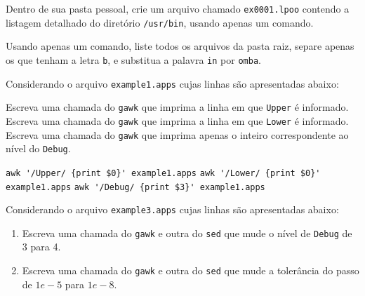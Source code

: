 \begin{Exercise}[label={0001},difficulty={1},origin={bash}]
  Dentro de sua pasta pessoal, crie um arquivo chamado \verb+ex0001.lpoo+
  contendo a listagem detalhado do diretório \verb+/usr/bin+, usando apenas um
  comando. 
\end{Exercise}

\begin{Exercise}[label={0002},difficulty={2},origin={bash}]
  Usando apenas um comando, liste todos os arquivos da pasta raiz, separe apenas
  os que tenham a letra \verb+b+, e substitua a palavra \verb+in+ por
  \verb+omba+.
\end{Exercise}

\begin{Exercise}[label={0003}, difficulty={1}, origin={gawk}]
  Considerando o arquivo \verb+example1.apps+ cujas linhas são
  apresentadas abaixo:
  
    \Question Escreva uma chamada do \verb+gawk+ que imprima a linha em que
      \verb+Upper+ é informado.
    \Question Escreva uma chamada do \verb+gawk+ que imprima a linha em que
      \verb+Lower+ é informado.
    \Question Escreva uma chamada do \verb+gawk+ que imprima apenas o inteiro
      correspondente ao nível do \verb+Debug+.
\end{Exercise}

\begin{Answer}[ref={0003}]
  \Question \verb+awk '/Upper/ {print $0}' example1.apps+
  \Question \verb+awk '/Lower/ {print $0}' example1.apps+
  \Question \verb+awk '/Debug/ {print $3}' example1.apps+
\end{Answer}

\begin{Exercise}[label={0004}, difficulty={1}, origin={gawk}]
  Considerando o arquivo \verb+example3.apps+ cujas linhas são
  apresentadas abaixo:
  
  \begin{enumerate}
    \item Escreva uma chamada do \verb+gawk+ e outra do \verb+sed+ que
      mude o nível de \verb+Debug+ de 3 para 4.
    \item Escreva uma chamada do \verb+gawk+ e outra do \verb+sed+ que
      mude a tolerância do passo de $1e-5$ para $1e-8$.
  \end{enumerate}
\end{Exercise}

